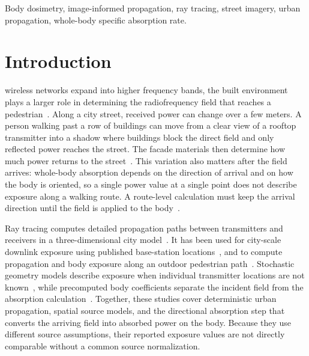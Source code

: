 \documentclass{ieeeaccess}
\begin{document}
\begin{keywords}
Body dosimetry, image-informed propagation, ray tracing, street imagery, urban
propagation, whole-body specific absorption rate.
\end{keywords}

\titlepgskip=-21pt
\maketitle

\section{Introduction}\label{sec:introduction}

 wireless networks expand into higher frequency bands,
the built environment plays a larger role in determining the radiofrequency
field that reaches a pedestrian~\cite{itu2040}. Along a city street, received
power can change over a few meters. A person walking past a row of buildings
can move from a clear view of a rooftop transmitter into a shadow where
buildings block the direct field and only reflected power reaches the
street. The facade materials then determine how much power returns to the
street~\cite{itu2040,vitucci}. This variation also matters after the field
arrives: whole-body absorption depends on the direction of arrival and on how
the body is oriented, so a single power value at a single point does not
describe exposure along a walking route. A route-level calculation must keep
the arrival direction until the field is applied to the
body~\cite{icnirp}.

Ray tracing computes detailed propagation paths between transmitters and
receivers in a three-dimensional city model~\cite{sionna}. It has been used for
city-scale downlink exposure using published base-station
locations~\cite{leeman}, and to compute propagation and body exposure along an
outdoor pedestrian path~\cite{wydaeghe2026}. Stochastic geometry models
describe exposure when individual transmitter locations are not
known~\cite{wiame}, while precomputed body coefficients separate the incident
field from the absorption calculation~\cite{varsier}. Together, these studies
cover deterministic urban propagation, spatial source models, and the
directional absorption step that converts the arriving field into absorbed power
on the body. Because they use different source assumptions, their reported
exposure values are not directly comparable without a common source
normalization.
\end{document}

